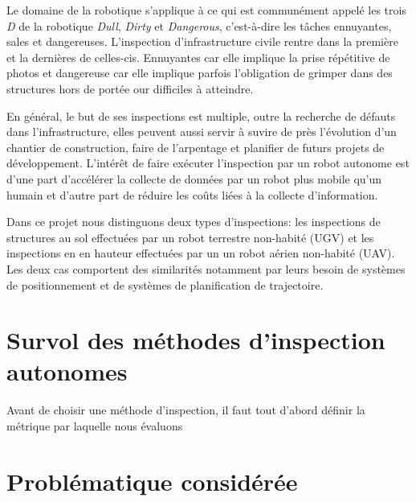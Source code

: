 \label{sec:Introduction}  %
Le domaine de la robotique s'applique à ce qui est communément appelé les trois \emph{D} de la robotique \emph{Dull}, \emph{Dirty} et \emph{Dangerous}, c'est-à-dire les tâches ennuyantes, sales et dangereuses. L'inspection d'infrastructure civile rentre dans la première et la dernières de celles-cis. Ennuyantes car elle implique la prise répétitive de photos et dangereuse car elle implique parfois l'obligation de grimper dans des structures hors de portée our difficiles à atteindre.

En général, le but de ses inspections est multiple, outre la recherche de défauts dans l'infrastructure, elles peuvent aussi servir à suvire de près l'évolution d'un chantier de construction, faire de l'arpentage et planifier de futurs projets de développement. L'intérêt de faire exécuter l'inspection par un robot autonome est d'une part d'accélérer la collecte de données par un robot plus mobile qu'un humain et d'autre part de réduire les coûts liées à la collecte d'information.

Dans ce projet nous distinguons deux types d'inspections: les inspections de structures au sol effectuées par un robot terrestre non-habité (UGV) et les inspections en en hauteur effectuées par un un robot aérien non-habité (UAV). Les deux cas comportent des similarités notamment par leurs besoin de systèmes de positionnement et de systèmes de planification de trajectoire.

\section{Survol des méthodes d'inspection autonomes}

Avant de choisir une méthode d'inspection, il faut tout d'abord définir la métrique par laquelle nous évaluons 

\section{Problématique considérée}

